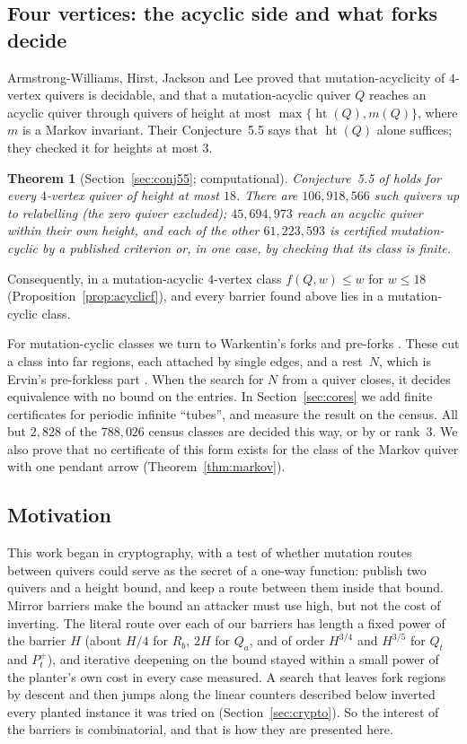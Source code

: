 \documentclass[11pt]{amsart}
\newtheorem{mainthm}{Theorem}
\theoremstyle{definition}
\theoremstyle{remark}
\newcommand{\htt}{\operatorname{ht}}
\begin{document}
\subsection{Four vertices: the acyclic side and what forks decide}
Armstrong-Williams, Hirst, Jackson and Lee \cite{AHJL} proved that mutation-acyclicity of $4$-vertex quivers is decidable, and that a mutation-acyclic quiver $Q$ reaches an acyclic quiver through quivers of height at most $\max\{\htt(Q),m(Q)\}$, where $m$ is a Markov invariant. Their Conjecture~5.5 says that $\htt(Q)$ alone suffices; they checked it for heights at most $3$.

\begin{mainthm}[Section~\ref{sec:conj55}; computational]\label{thmE}
Conjecture~5.5 of \cite{AHJL} holds for every $4$-vertex quiver of height at most $18$. There are $106{,}918{,}566$ such quivers up to relabelling (the zero quiver excluded); $45{,}694{,}973$ reach an acyclic quiver within their own height, and each of the other $61{,}223{,}593$ is certified mutation-cyclic by a published criterion or, in one case, by checking that its class is finite.
\end{mainthm}

Consequently, in a mutation-acyclic $4$-vertex class $f(Q,w)\le w$ for $w\le18$ (Proposition~\ref{prop:acyclicf}), and every barrier found above lies in a mutation-cyclic class.

For mutation-cyclic classes we turn to Warkentin's forks and pre-forks \cite{War}. These cut a class into far regions, each attached by single edges, and a rest~$N$, which is Ervin's pre-forkless part \cite{Erv}. When the search for $N$ from a quiver closes, it decides equivalence with no bound on the entries. In Section~\ref{sec:cores} we add finite certificates for periodic infinite ``tubes'', and measure the result on the census. All but $2{,}828$ of the $788{,}026$ census classes are decided this way, or by \cite{AHJL} or rank~$3$. We also prove that no certificate of this form exists for the class of the Markov quiver with one pendant arrow (Theorem~\ref{thm:markov}).

\subsection{Motivation}
This work began in cryptography, with a test of whether mutation routes between quivers could serve as the secret of a one-way function: publish two quivers and a height bound, and keep a route between them inside that bound. Mirror barriers make the bound an attacker must use high, but not the cost of inverting. The literal route over each of our barriers has length a fixed power of the barrier $H$ (about $H/4$ for $R_b$, $2H$ for $Q_a$, and of order $H^{3/4}$ and $H^{3/5}$ for $Q_t$ and $P^+_t$), and iterative deepening on the bound stayed within a small power of the planter's own cost in every case measured. A search that leaves fork regions by descent and then jumps along the linear counters described below inverted every planted instance it was tried on (Section~\ref{sec:crypto}). So the interest of the barriers is combinatorial, and that is how they are presented here.
\end{document}
